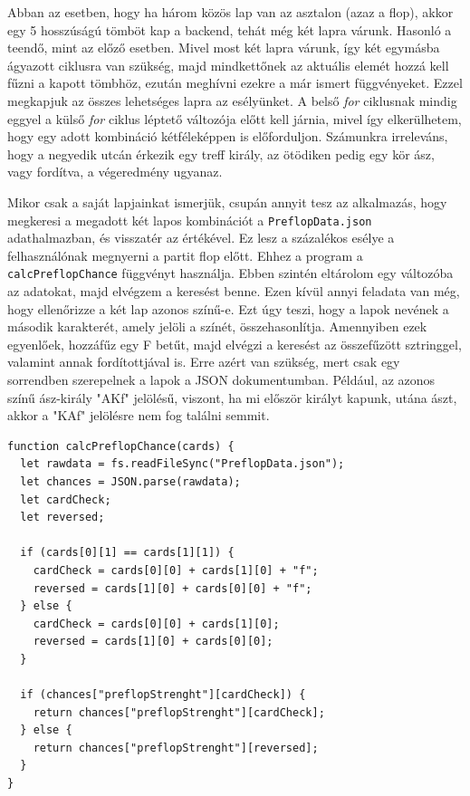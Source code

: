 Abban az esetben, hogy ha három közös lap van az asztalon (azaz a flop), akkor egy 5 hosszúságú tömböt kap a backend, tehát még két lapra várunk. Hasonló a teendő, mint az előző esetben. Mivel most két lapra várunk, így két egymásba ágyazott ciklusra van szükség, majd mindkettőnek az aktuális elemét hozzá kell fűzni a kapott tömbhöz, ezután meghívni ezekre a már ismert függvényeket. Ezzel megkapjuk az összes lehetséges lapra az esélyünket. A belső \textit{for} ciklusnak mindig eggyel a külső \textit{for} ciklus léptető változója előtt kell járnia, mivel így elkerülhetem, hogy egy adott kombináció kétféleképpen is előforduljon. Számunkra irreleváns, hogy a negyedik utcán érkezik egy treff király, az ötödiken pedig egy kör ász, vagy fordítva, a végeredmény ugyanaz.

Mikor csak a saját lapjainkat ismerjük, csupán annyit tesz az alkalmazás, hogy megkeresi a megadott két lapos kombinációt a \texttt{PreflopData.json} adathalmazban, és visszatér az értékével. Ez lesz a százalékos esélye a felhasználónak megnyerni a partit flop előtt. Ehhez a program a \texttt{calcPreflopChance} függvényt használja. Ebben szintén eltárolom egy változóba az adatokat, majd elvégzem a keresést benne. Ezen kívül annyi feladata van még, hogy ellenőrizze a két lap azonos színű-e. Ezt úgy teszi, hogy a lapok nevének a második karakterét, amely jelöli a színét, összehasonlítja. Amennyiben ezek egyenlőek, hozzáfűz egy F betűt, majd elvégzi a keresést az összefűzött sztringgel, valamint annak fordítottjával is. Erre azért van szükség, mert csak egy sorrendben szerepelnek a lapok a JSON dokumentumban. Például, az azonos színű ász-király "AKf" jelölésű, viszont, ha mi először királyt kapunk, utána ászt, akkor a "KAf" jelölésre nem fog találni semmit.

\begin{lstlisting}[style=htmlcssjs]
function calcPreflopChance(cards) {
  let rawdata = fs.readFileSync("PreflopData.json");
  let chances = JSON.parse(rawdata);
  let cardCheck;
  let reversed;

  if (cards[0][1] == cards[1][1]) {
    cardCheck = cards[0][0] + cards[1][0] + "f";
    reversed = cards[1][0] + cards[0][0] + "f";
  } else {
    cardCheck = cards[0][0] + cards[1][0];
    reversed = cards[1][0] + cards[0][0];
  }

  if (chances["preflopStrenght"][cardCheck]) {
    return chances["preflopStrenght"][cardCheck];
  } else {
    return chances["preflopStrenght"][reversed];
  }
}
\end{lstlisting}

